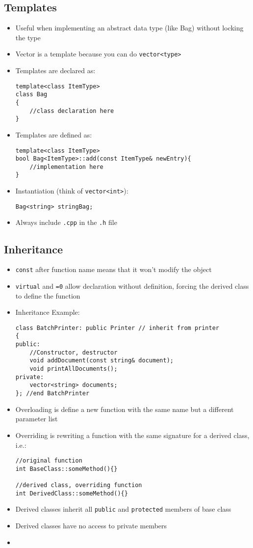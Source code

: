 \documentclass{article}
\begin{document}
\subsection{Templates}
\begin{itemize}
    \item Useful when implementing an abstract data type (like Bag) without locking the type
    \item Vector is a template because you can do \verb|vector<type>|
    \item Templates are declared as:
    \begin{verbatim}
template<class ItemType>
class Bag
{
    //class declaration here
}
    \end{verbatim}
    \item Templates are defined as:
    \begin{verbatim}
template<class ItemType>
bool Bag<ItemType>::add(const ItemType& newEntry){
    //implementation here
}
    \end{verbatim}
    \item Instantiation (think of \verb|vector<int>|):
    \begin{verbatim}
Bag<string> stringBag;
    \end{verbatim}
    \item Always include \verb|.cpp| in the \verb|.h| file
\end{itemize}

\subsection{Inheritance}
\begin{itemize}
    \item \verb|const| after function name means that it won't modify the object
    \item \verb|virtual| and \verb|=0| allow declaration without definition, forcing the derived class to define the function
    \item Inheritance Example:
    \begin{verbatim}
class BatchPrinter: public Printer // inherit from printer
{ 
public:  
    //Constructor, destructor 
    void addDocument(const string& document); 
    void printAllDocuments();
private: 
    vector<string> documents; 
}; //end BatchPrinter
    \end{verbatim}
    \item Overloading is define a new function with the same name but a different parameter list
    \item Overriding is rewriting a function with the same signature for a derived class, i.e.:
    \begin{verbatim}
//original function
int BaseClass::someMethod(){} 

//derived class, overriding function
int DerivedClass::someMethod(){} 
    \end{verbatim}
    \item Derived classes inherit all \verb|public| and \verb|protected| members of base class
    \item Derived classes have no access to private members
    \item 
\end{itemize}
\end{document}

